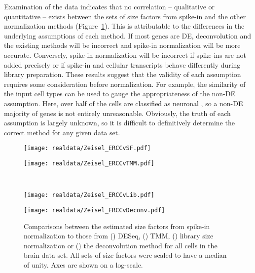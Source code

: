 \documentclass{article}
\begin{document}
Examination of the data indicates that no correlation -- qualitative or quantitative -- 
    exists between the sets of size factors from spike-in and the other normalization methods (Figure~\ref{fig:real_spike}).
This is attributable to the differences in the underlying assumptions of each method.
If most genes are DE, deconvolution and the existing methods will be incorrect and spike-in normalization will be more accurate.
Conversely, spike-in normalization will be incorrect if spike-ins are not added precisely or if spike-in and cellular transcripts behave differently during library preparation.
These results suggest that the validity of each assumption requires some consideration before normalization.
For example, the similarity of the input cell types can be used to gauge the appropriateness of the non-DE assumption. 
Here, over half of the cells are classified as neuronal \cite{zeisel2015brain}, so a non-DE majority of genes is not entirely unreasonable.
Obviously, the truth of each assumption is largely unknown, so it is difficult to definitively determine the correct method for any given data set.

\begin{figure}[btp]
\begin{center}
    \begin{minipage}{0.33\textwidth}
        \texttt{[image: realdata/Zeisel\_ERCCvSF.pdf]}
        \subcaption{}\label{subfig:spike_sf}
    \end{minipage}
    \begin{minipage}{0.33\textwidth}
        \texttt{[image: realdata/Zeisel\_ERCCvTMM.pdf]}
        \subcaption{}\label{subfig:spike_tmm}
    \end{minipage} \\ 
    \begin{minipage}{0.33\textwidth}
        \texttt{[image: realdata/Zeisel\_ERCCvLib.pdf]}
        \subcaption{}\label{subfig:spike_lib}
    \end{minipage} 
    \begin{minipage}{0.33\textwidth}
        \texttt{[image: realdata/Zeisel\_ERCCvDeconv.pdf]}
        \subcaption{}\label{subfig:spike_sum}
    \end{minipage}
\end{center}
    \caption{
        Comparisons between the estimated size factors from spike-in normalization to those from () DESeq, () TMM,
            () library size normalization or () the deconvolution method for all cells in the brain data set.                  
        All sets of size factors were scaled to have a median of unity.
        Axes are shown on a log-scale.
    }
    \label{fig:real_spike}  
\end{figure}
\end{document}
